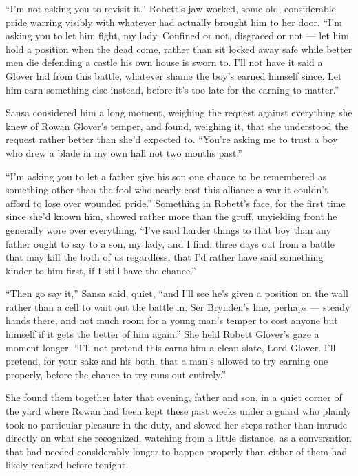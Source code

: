 “I’m not asking you to revisit it.” Robett’s jaw worked, some old, considerable pride warring visibly with whatever had actually brought him to her door. “I’m asking you to let him fight, my lady. Confined or not, disgraced or not — let him hold a position when the dead come, rather than sit locked away safe while better men die defending a castle his own house is sworn to. I’ll not have it said a Glover hid from this battle, whatever shame the boy’s earned himself since. Let him earn something else instead, before it’s too late for the earning to matter.”

Sansa considered him a long moment, weighing the request against everything she knew of Rowan Glover’s temper, and found, weighing it, that she understood the request rather better than she’d expected to. “You’re asking me to trust a boy who drew a blade in my own hall not two months past.”

“I’m asking you to let a father give his son one chance to be remembered as something other than the fool who nearly cost this alliance a war it couldn’t afford to lose over wounded pride.” Something in Robett’s face, for the first time since she’d known him, showed rather more than the gruff, unyielding front he generally wore over everything. “I’ve said harder things to that boy than any father ought to say to a son, my lady, and I find, three days out from a battle that may kill the both of us regardless, that I’d rather have said something kinder to him first, if I still have the chance.”

“Then go say it,” Sansa said, quiet, “and I’ll see he’s given a position on the wall rather than a cell to wait out the battle in. Ser Brynden’s line, perhaps — steady hands there, and not much room for a young man’s temper to cost anyone but himself if it gets the better of him again.” She held Robett Glover’s gaze a moment longer. “I’ll not pretend this earns him a clean slate, Lord Glover. I’ll pretend, for your sake and his both, that a man’s allowed to try earning one properly, before the chance to try runs out entirely.”

\sceneBreak

She found them together later that evening, father and son, in a quiet corner of the yard where Rowan had been kept these past weeks under a guard who plainly took no particular pleasure in the duty, and slowed her steps rather than intrude directly on what she recognized, watching from a little distance, as a conversation that had needed considerably longer to happen properly than either of them had likely realized before tonight.

